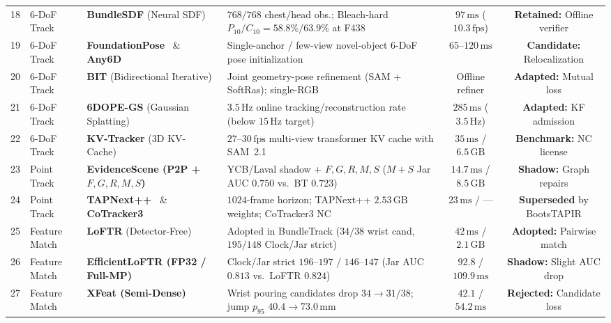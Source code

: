 \documentclass{evidencescene}
\begin{document}
\begin{table}[t]
{\begin{tabular}{@{}rllp{6.5cm}cc@{}}
        18 & 6-DoF Track & \textbf{BundleSDF} (Neural SDF)~\cite{bundlesdf} & $768/768$ chest/head obs.; Bleach-hard $P_{10}/C_{10}=58.8\%/63.9\%$ at F438 & $97\,\mathrm{ms}$ ($10.3\,\mathrm{fps}$) & \textbf{Retained:} Offline verifier \\
        19 & 6-DoF Track & \textbf{FoundationPose}~\cite{foundationpose} \& \textbf{Any6D}~\cite{lee2025any6d} & Single-anchor / few-view novel-object 6-DoF pose initialization & $65$--$120\,\mathrm{ms}$ & \textbf{Candidate:} Relocalization \\
        20 & 6-DoF Track & \textbf{BIT} (Bidirectional Iterative)~\cite{song2025bit} & Joint geometry-pose refinement (SAM + SoftRas); single-RGB & Offline refiner & \textbf{Adapted:} Mutual loss \\
        21 & 6-DoF Track & \textbf{6DOPE-GS} (Gaussian Splatting)~\cite{jin20256dopegs} & $3.5\,\mathrm{Hz}$ online tracking/reconstruction rate (below $15\,\mathrm{Hz}$ target) & $285\,\mathrm{ms}$ ($3.5\,\mathrm{Hz}$) & \textbf{Adapted:} KF admission \\
        22 & 6-DoF Track & \textbf{KV-Tracker} (3D KV-Cache)~\cite{elich2026kvtracker} & $27$--$30\,\mathrm{fps}$ multi-view transformer KV cache with SAM~2.1 & $35\,\mathrm{ms}$ / $6.5\,\mathrm{GB}$ & \textbf{Benchmark:} NC license \\
        23 & Point Track & \textbf{EvidenceScene (P2P + $F,G,R,M,S$)}~\cite{point2pose} & YCB/Laval shadow + $F,G,R,M,S$ ($M+S$ Jar AUC $0.750$ vs.\ BT $0.723$) & $14.7\,\mathrm{ms}$ / $8.5\,\mathrm{GB}$ & \textbf{Shadow:} Graph repairs \\
        24 & Point Track & \textbf{TAPNext++}~\cite{zholus2025tapnext} \& \textbf{CoTracker3}~\cite{karaev2024cotracker3} & $1024$-frame horizon; TAPNext++ $2.53\,\mathrm{GB}$ weights; CoTracker3 NC & $23\,\mathrm{ms}$ / --- & \textbf{Superseded} by BootsTAPIR \\
        25 & Feature Match & \textbf{LoFTR} (Detector-Free)~\cite{loftr} & Adopted in BundleTrack ($34/38$ wrist cand, $195/148$ Clock/Jar strict) & $42\,\mathrm{ms}$ / $2.1\,\mathrm{GB}$ & \textbf{Adopted:} Pairwise match \\
        26 & Feature Match & \textbf{EfficientLoFTR (FP32 / Full-MP)}~\cite{eloftr} & Clock/Jar strict $196$--$197$ / $146$--$147$ (Jar AUC $0.813$ vs.\ LoFTR $0.824$) & $92.8$ / $109.9\,\mathrm{ms}$ & \textbf{Shadow:} Slight AUC drop \\
        27 & Feature Match & \textbf{XFeat (Semi-Dense)}~\cite{xfeat} & Wrist pouring candidates drop $34 \to 31/38$; jump $p_{95}$ $40.4 \to 73.0\,\mathrm{mm}$ & $42.1$ / $54.2\,\mathrm{ms}$ & \textbf{Rejected:} Candidate loss \\

\end{tabular}}
\end{table}
\end{document}
